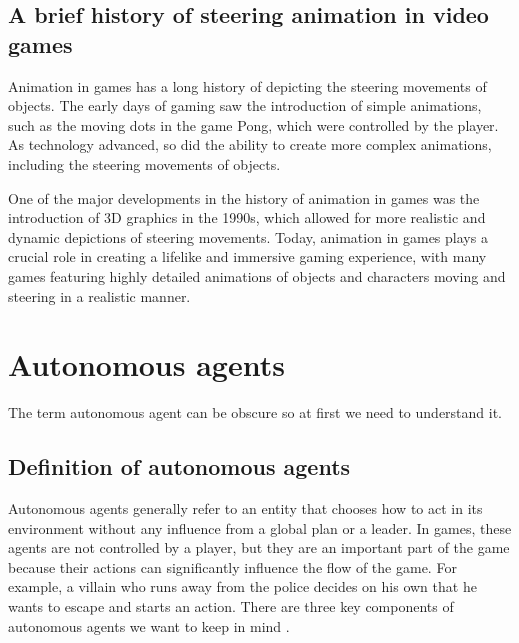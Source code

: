 \documentclass[10pt,twoside,english,a4paper]{article}
\begin{document}
\subsection{A brief history of steering animation in video games} \label{history}
Animation in games has a long history of depicting the steering movements of 
objects. The early days of gaming saw the introduction of simple animations, 
such as the moving dots in the game Pong, which were controlled by the player. 
As technology advanced, so did the ability to create more complex animations, 
including the steering movements of objects. 

One of the major developments in 
the history of animation in games was the introduction of 3D graphics in the 
1990s, which allowed for more realistic and dynamic depictions of steering 
movements. Today, animation in games plays a crucial role in creating a lifelike 
and immersive gaming experience, with many games featuring highly detailed 
animations of objects and characters moving and steering in a realistic manner.

\section{Autonomous agents} \label{autonomous agents}

The term autonomous agent can be obscure so at first we need to 
understand it.

\subsection{Definition of autonomous agents} \label{definition of a.a.}

Autonomous agents generally refer to an entity that chooses 
how to act in its environment without any influence from a global 
plan or a leader. In games, these agents are not controlled by a 
player, but they are an important part of the game because their actions
can significantly influence the flow of the game. For example, 
a villain who runs away from the police decides on his own that he
wants to escape and starts an action. There are three key 
components of autonomous agents we want to keep in mind 
\cite{Verhagen}. 
\end{document}
